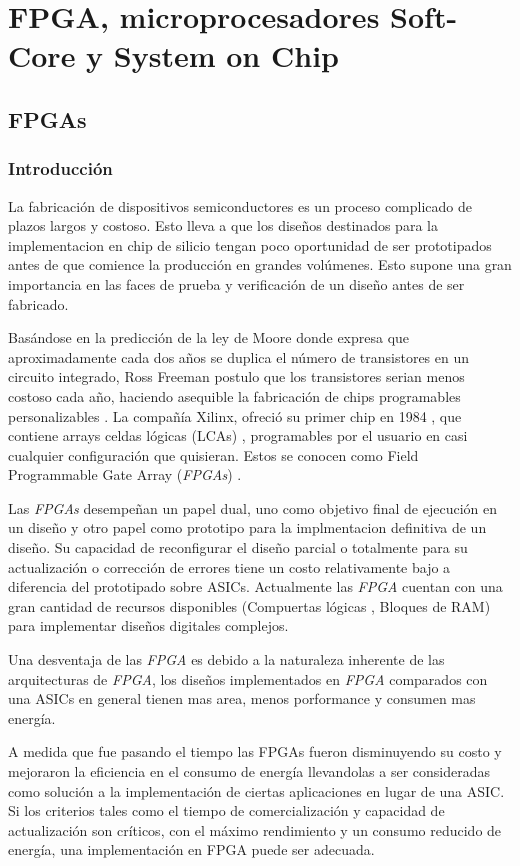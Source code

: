 
\chapter{FPGA, microprocesadores Soft-Core y System on Chip}
	

\section{FPGAs}

	\subsection{Introducción}
La fabricación de dispositivos semiconductores es un proceso complicado de plazos largos y costoso. Esto lleva a que los diseños destinados para la  implementacion en chip de silicio tengan poco oportunidad de ser prototipados antes de que comience la producción en grandes volúmenes. Esto supone una gran importancia  en las faces de prueba y verificación de un diseño antes de ser fabricado.

Basándose en la predicción de la ley de Moore donde expresa que aproximadamente cada dos años se duplica el número de transistores en un circuito integrado\cite{Etiqueta02}, Ross Freeman postulo que los transistores serian menos costoso cada año, haciendo asequible la fabricación de chips programables personalizables \cite{Etiqueta03}.
La compañía Xilinx, ofreció su primer chip en 1984 , que contiene arrays celdas lógicas (LCAs) , programables por el usuario en casi cualquier configuración que quisieran. Estos se conocen como Field Programmable Gate Array (\textit{FPGAs}) .

Las \textit{FPGAs} desempeñan un papel dual, uno como objetivo final de ejecución en un diseño y otro papel como prototipo para la implmentacion definitiva de un diseño. Su capacidad de reconfigurar el diseño parcial o totalmente para su actualización o corrección de errores tiene un costo relativamente bajo a diferencia del prototipado sobre ASICs.
Actualmente las \textit{FPGA} cuentan con una gran cantidad de recursos disponibles (Compuertas lógicas , Bloques de RAM) para implementar diseños digitales complejos.

Una desventaja de las \textit{FPGA}  es debido a la naturaleza inherente de las arquitecturas de \textit{FPGA}, los diseños implementados en \textit{FPGA} comparados con una ASICs en general tienen mas area, menos porformance y consumen mas energía.
		
A medida que fue pasando el tiempo las FPGAs fueron disminuyendo su costo y mejoraron la eficiencia en el consumo de energía llevandolas a ser consideradas como solución a la implementación de ciertas aplicaciones en lugar de una ASIC. Si los criterios tales como el tiempo de comercialización y capacidad de actualización son críticos, con el máximo rendimiento y un consumo reducido de energía, una implementación en  FPGA puede ser adecuada.


